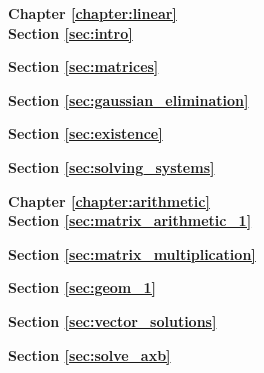 \small

\begin{adjustwidth}{-70pt}{-70pt}
\raggedright
\begin{multicols}{3}

{\Large \bf Chapter \ref{chapter:linear}}\\

\textbf{Section \ref{sec:intro}}



\textbf{Section \ref{sec:matrices}}



\textbf{Section \ref{sec:gaussian_elimination}}



\textbf{Section \ref{sec:existence}}



\textbf{Section \ref{sec:solving_systems}}



{\Large \bf Chapter \ref{chapter:arithmetic}}\\

\textbf{Section \ref{sec:matrix_arithmetic_1}}



\textbf{Section \ref{sec:matrix_multiplication}}



\textbf{Section \ref{sec:geom_1}}



\textbf{Section \ref{sec:vector_solutions}}



\textbf{Section \ref{sec:solve_axb}}




\end{multicols}
\end{adjustwidth}

